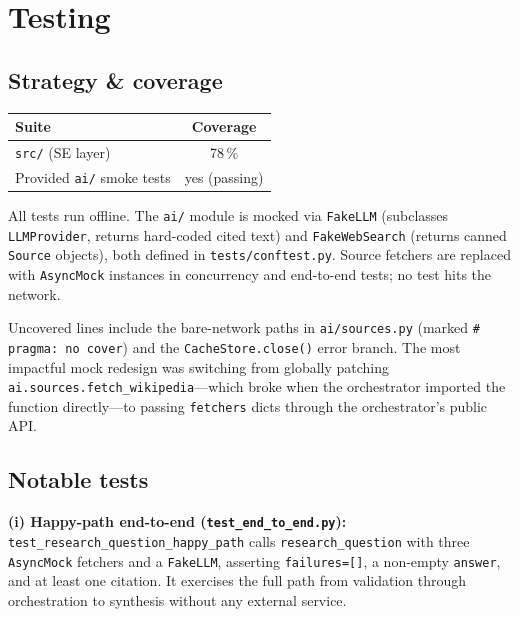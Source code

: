 \documentclass[11pt,a4paper]{article}
\begin{document}
\section{Testing}\label{sec:testing}

\subsection{Strategy \& coverage}

\begin{center}\small
\begin{tabular}{lc}
\toprule
\textbf{Suite} & \textbf{Coverage} \\
\midrule
\texttt{src/} (SE layer) & 78\,\% \\
Provided \texttt{ai/} smoke tests & yes (passing) \\
\bottomrule
\end{tabular}
\end{center}

All tests run offline. The \texttt{ai/} module is mocked via \texttt{FakeLLM} (subclasses \texttt{LLMProvider}, returns hard-coded cited text) and \texttt{FakeWebSearch} (returns canned \texttt{Source} objects), both defined in \texttt{tests/conftest.py}. Source fetchers are replaced with \texttt{AsyncMock} instances in concurrency and end-to-end tests; no test hits the network.

Uncovered lines include the bare-network paths in \texttt{ai/sources.py} (marked \texttt{\# pragma: no cover}) and the \texttt{CacheStore.close()} error branch. The most impactful mock redesign was switching from globally patching \texttt{ai.sources.fetch\_wikipedia}---which broke when the orchestrator imported the function directly---to passing \texttt{fetchers} dicts through the orchestrator's public API.

\subsection{Notable tests}

\textbf{(i) Happy-path end-to-end (\texttt{test\_end\_to\_end.py}):} \texttt{test\_research\_question\_happy\_path} calls \texttt{research\_question} with three \texttt{AsyncMock} fetchers and a \texttt{FakeLLM}, asserting \texttt{failures=[]}, a non-empty \texttt{answer}, and at least one citation. It exercises the full path from validation through orchestration to synthesis without any external service.
\end{document}
